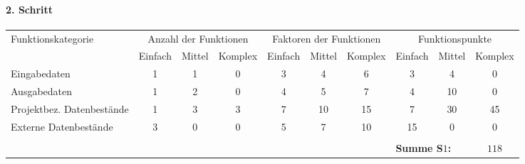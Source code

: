 \begin{landscape}
	\paragraph{2. Schritt}
	\begin{center}
		\begin{tabular}{|l|ccc|ccc|ccc|}
			\hline
			\multirow{2}{*}{Funktionskategorie} & \multicolumn{3}{c|}{Anzahl der Funktionen} & \multicolumn{3}{c|}{Faktoren der Funktionen} & \multicolumn{3}{c|}{Funktionspunkte}\\
			& Einfach & Mittel & Komplex & Einfach & Mittel & Komplex & Einfach & Mittel & Komplex\\
			\hline
			Eingabedaten & 1 & 1 & 0 & 3 & 4 & 6 & 3 & 4 & 0\\
			Ausgabedaten & 1 & 2 & 0 & 4 & 5 & 7 & 4 & 10 & 0\\
			Projektbez. Datenbestände & 1 & 3 & 3 & 7 & 10 & 15 & 7 & 30 & 45\\
			Externe Datenbestände & 3 & 0 & 0 & 5 & 7 & 10 & 15 & 0 & 0\\
			\hline
			\multicolumn{10}{c}{}\\
			\cline{8-10}
			\multicolumn{7}{c}{} & \multicolumn{2}{|l|}{{\bf Summe S$1$:}} & {\bf $118$}\\
			\cline{8-10}			
		\end{tabular}
	\end{center}
	\vspace{0.2cm}
	\begin{minipage}{0.7\textwidth}

\end{minipage}
\end{landscape}
